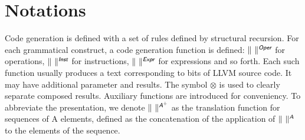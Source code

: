 \documentclass{llncs}
\newcommand{\trad}[2]{\ensuremath{\lVert \textsf{#1} \rVert^{\textit{#2}}}}
\newcommand{\B}[1]{\textsf{#1}}
\newcommand{\ListOf}[1]{$\mbox{#1}^+$}
\newcommand{\sep}[0]{\otimes}
\begin{document}
\section{Notations}
\label{sec:notation}

Code generation is defined with a set of rules defined by
structural recursion. For each grammatical construct, a code generation function
is defined: $\trad{~}{\B{Oper}}$ for operations, $\trad{~}{\B{Inst}}$ for
instructions, $\trad{~}{\B{Expr}}$ for expressions and so forth. Each such
function usually produces a text corresponding to bits of LLVM source code. It
may have additional parameter and results. The symbol $\sep$ is used to clearly
separate composed results. Auxiliary functions are introduced for
conveniency. To abbreviate the presentation, we denote
$\trad{~}{\ListOf{\B{A}}}$ as the translation function for sequences of \B{A}
elements, defined as the concatenation of the application of $\trad{~}{\B{A}}$
to the elements of the sequence.
\end{document}
